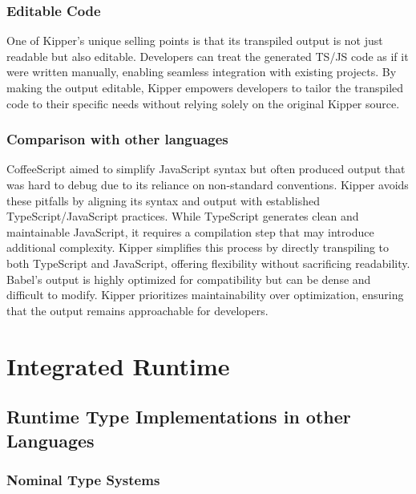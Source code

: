 \subsubsection{Editable Code}
One of Kipper's unique selling points is that its transpiled output is not just readable but also editable. Developers can treat the generated TS/JS code as if it were written manually, enabling seamless integration with existing projects. By making the output editable, Kipper empowers developers to tailor the transpiled code to their specific needs without relying solely on the original Kipper source.

\subsubsection{Comparison with other languages}
CoffeeScript aimed to simplify JavaScript syntax but often produced output that was hard to debug due to its reliance on non-standard conventions. Kipper avoids these pitfalls by aligning its syntax and output with established TypeScript/JavaScript practices. While TypeScript generates clean and maintainable JavaScript, it requires a compilation step that may introduce additional complexity. Kipper simplifies this process by directly transpiling to both TypeScript and JavaScript, offering flexibility without sacrificing readability. Babel's output is highly optimized for compatibility but can be dense and difficult to modify. Kipper prioritizes maintainability over optimization, ensuring that the output remains approachable for developers.

\section{Integrated Runtime}
\label{sec:integrated-runtime}

\subsection{Runtime Type Implementations in other Languages}
\label{chap:runtime-other-languages}

\subsubsection{Nominal Type Systems}

